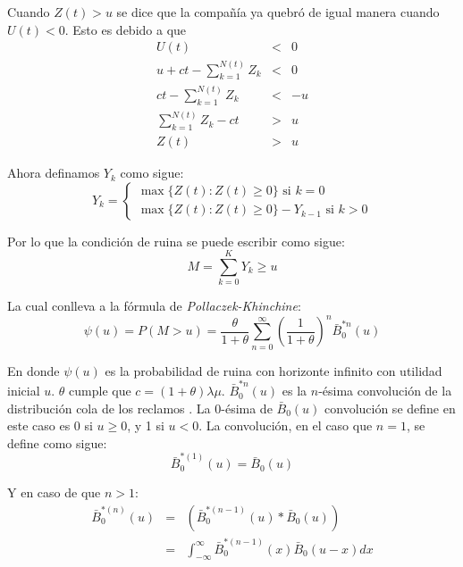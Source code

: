\documentclass[journal]{IEEEtran}
\begin{document}
            Cuando $Z(t) > u$ se dice que la compañía ya quebró de igual manera cuando $U(t)<0$. Esto es debido a que 
            \begin{eqnarray*}
                U(t) &<& 0\\
                u + ct - \sum_{k=1}^{N(t)} {Z_k} &<& 0\\
                ct -\sum_{k=1}^{N(t)} {Z_k} &<& - u\\
                \sum_{k=1}^{N(t)} {Z_k} - ct &>& u\\
                Z(t) &>& u
            \end{eqnarray*}

            Ahora definamos $Y_k$ como sigue:
            \begin{equation}
                Y_k = \begin{cases}
                    \max{\{Z(t): Z(t)\geq0\}} \text{ si } k=0\\
                    \max{\{Z(t) : Z(t)\geq0\}} - Y_{k-1} \text{ si } k>0
                \end{cases}
            \end{equation}

            Por lo que la condición de ruina se puede escribir como sigue:
            \begin{equation}
                M = \sum_{k=0}^K Y_k \geq u
            \end{equation}

            La cual conlleva a la fórmula de \emph{Pollaczek-Khinchine}:
            \begin{equation}
                \psi (u) = P(M>u) = \frac{\theta}{1+\theta} \sum_{n=0}^\infty \left (\frac{1}{1+\theta}\right)^n \bar{B}_0^{*n}(u)
            \end{equation}

            En donde $\psi (u)$ es la probabilidad de ruina con horizonte infinito con utilidad inicial $u$. $\theta$ cumple que $c=(1+\theta)\lambda \mu$. $\bar{B}_0^{*n}(u)$ es la $n$-ésima convolución de la distribución cola de los reclamos \cite{taboga-2021}. La 0-ésima de $\bar{B}_0 (u)$ convolución se define en este caso es 0 si $u \geq 0$, y 1 si $u < 0$. La convolución, en el caso que $n=1$, se define como sigue:
            \begin{equation}
                \bar{B}_0^{*(1)}(u)=\bar{B}_0 (u)
            \end{equation}

            Y en caso de que $n > 1$:
            \begin{eqnarray*}
                \bar{B}_0^{*(n)}(u)&=&(\bar{B}_0^{*(n-1)} (u) * \bar{B}_0 (u))\\
                &=& \int _{-\infty}^{\infty} \bar{B}_0^{*(n-1)} (x) \bar{B}_0 (u-x) dx
            \end{eqnarray*}
    
\end{document}
